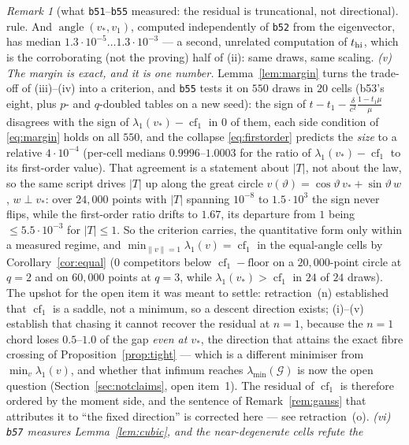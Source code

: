 \documentclass[11pt]{article}
\theoremstyle{remark}
\newtheorem{remark}{Remark}[section]
\newcommand{\Gr}{\mathcal{G}}
\begin{document}
\begin{remark}[what \texttt{b51}--\texttt{b55} measured: the residual is truncational, not directional]
rule. And $\operatorname{angle}(v_\ast,v_1)$, computed independently of \texttt{b52} from the
eigenvector, has median
$1.3\cdot10^{-5}\ldots1.3\cdot10^{-3}$ --- a second, unrelated computation of $t_{\rm hi}$, which is
the corroborating (not the proving) half of (ii): same draws, same scaling.
\emph{(v) The margin is exact, and it is one number.} Lemma~\ref{lem:margin} turns the trade-off of
(iii)--(iv) into a criterion, and \texttt{b55} tests it on $550$ draws in $20$ cells (b53's eight, plus
$p$- and $q$-doubled tables on a new seed): the sign of
$t-t_1-\frac{\delta}{c^2}\frac{1-t_1\mu}{\mu}$ disagrees with the sign of
$\lambda_1(v_\ast)-\operatorname{cf}_1$ in $0$ of them, each side condition of
\eqref{eq:margin} holds on all $550$, and the collapse \eqref{eq:firstorder} predicts the
\emph{size} to a relative $4\cdot10^{-4}$ (per-cell medians $0.9996$--$1.0003$ for the ratio of
$\lambda_1(v_\ast)-\operatorname{cf}_1$ to its first-order value). That agreement is a statement about
$|T|$, not about the law, so the same script drives $|T|$ up along the great circle
$v(\vartheta)=\cos\vartheta\,v_\ast+\sin\vartheta\,w$, $w\perp v_\ast$: over $24{,}000$ points with
$|T|$ spanning $10^{-8}$ to $1.5\cdot10^{3}$ the sign never flips, while the first-order ratio drifts
to $1.67$, its departure from $1$ being $\le5.5\cdot10^{-3}$ for $|T|\le1$. So the criterion carries,
the quantitative form only within a measured regime, and
$\min_{\|v\|=1}\lambda_1(v)=\operatorname{cf}_1$ in the equal-angle cells by Corollary~\ref{cor:equal}
($0$ competitors below $\operatorname{cf}_1-\text{floor}$ on a $20{,}000$-point circle at $q=2$ and on
$60{,}000$ points at $q=3$, while $\lambda_1(v_\ast)>\operatorname{cf}_1$ in $24$ of $24$ draws).
The upshot for the open item it was meant to settle: retraction~(n) established that
$\operatorname{cf}_1$ is a saddle, not a minimum, so a descent direction exists; (i)--(v) establish
that chasing it cannot recover the residual at $n=1$, because the $n=1$ chord loses
$0.5$--$1.0$ of the gap \emph{even at $v_\ast$}, the direction that attains the exact fibre crossing
of Proposition~\ref{prop:tight} --- which is a different minimiser from $\min_v\lambda_1(v)$, and
whether that infimum reaches $\lambda_{\min}(\Gr)$ is now the open question (Section~\ref{sec:notclaims},
open item~1). The residual of $\operatorname{cf}_1$ is
therefore ordered by the moment side, and the sentence of Remark~\ref{rem:gauss} that attributes it to
``the fixed direction'' is corrected here --- see retraction~(o).
\emph{(vi) \texttt{b57} measures Lemma~\ref{lem:cubic}, and the near-degenerate cells refute the
}
\end{remark}
\end{document}
